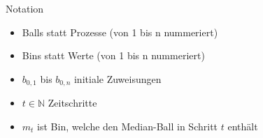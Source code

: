 \documentclass{beamer}
\begin{document}
    \begin{frame}{Notation}
        \begin{itemize}
            \item Balls statt Prozesse (von 1 bis n nummeriert)
            \vfill
            \item Bins statt Werte (von 1 bis n nummeriert)
            \vfill
            \item \(b_{0,1}\) bis \(b_{0,n}\) initiale Zuweisungen
            \vfill
            \item \(t \in \mathbb{N}\) Zeitschritte
            \vfill
            \item \(m_t\) ist Bin, welche den Median-Ball in Schritt
                  \(t\) enthält
        \end{itemize}
    \end{frame}
\end{document}
